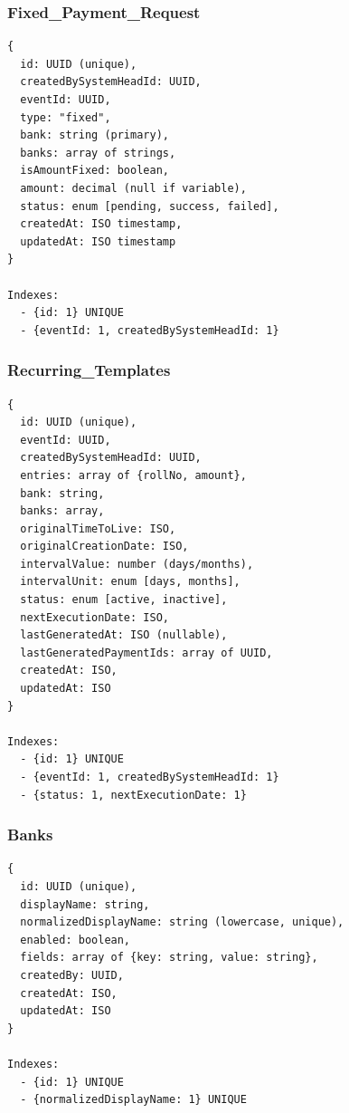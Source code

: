 \documentclass[12pt,a4paper]{article}
\begin{document}
\subsubsection{Fixed\_Payment\_Request}
\begin{lstlisting}
{
  id: UUID (unique),
  createdBySystemHeadId: UUID,
  eventId: UUID,
  type: "fixed",
  bank: string (primary),
  banks: array of strings,
  isAmountFixed: boolean,
  amount: decimal (null if variable),
  status: enum [pending, success, failed],
  createdAt: ISO timestamp,
  updatedAt: ISO timestamp
}

Indexes:
  - {id: 1} UNIQUE
  - {eventId: 1, createdBySystemHeadId: 1}
\end{lstlisting}

\subsubsection{Recurring\_Templates}
\begin{lstlisting}
{
  id: UUID (unique),
  eventId: UUID,
  createdBySystemHeadId: UUID,
  entries: array of {rollNo, amount},
  bank: string,
  banks: array,
  originalTimeToLive: ISO,
  originalCreationDate: ISO,
  intervalValue: number (days/months),
  intervalUnit: enum [days, months],
  status: enum [active, inactive],
  nextExecutionDate: ISO,
  lastGeneratedAt: ISO (nullable),
  lastGeneratedPaymentIds: array of UUID,
  createdAt: ISO,
  updatedAt: ISO
}

Indexes:
  - {id: 1} UNIQUE
  - {eventId: 1, createdBySystemHeadId: 1}
  - {status: 1, nextExecutionDate: 1}
\end{lstlisting}

\subsubsection{Banks}
\begin{lstlisting}
{
  id: UUID (unique),
  displayName: string,
  normalizedDisplayName: string (lowercase, unique),
  enabled: boolean,
  fields: array of {key: string, value: string},
  createdBy: UUID,
  createdAt: ISO,
  updatedAt: ISO
}

Indexes:
  - {id: 1} UNIQUE
  - {normalizedDisplayName: 1} UNIQUE
\end{lstlisting}
\end{document}
